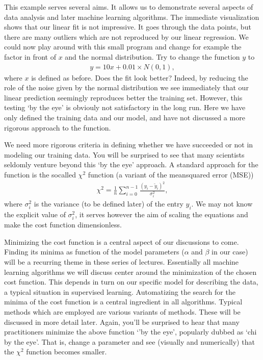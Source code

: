 \documentclass[letterpaper,10pt,english]{sphinxmanual}
\begin{document}
This example serves several aims. It allows us to demonstrate several
aspects of data analysis and later machine learning algorithms. The
immediate visualization shows that our linear fit is not
impressive. It goes through the data points, but there are many
outliers which are not reproduced by our linear regression.  We could
now play around with this small program and change for example the
factor in front of \(x\) and the normal distribution.  Try to change the
function \(y\) to
\begin{equation*}
\begin{split}
y = 10x+0.01 \times N(0,1),
\end{split}
\end{equation*}
where \(x\) is defined as before.  Does the fit look better? Indeed, by
reducing the role of the noise given by the normal distribution we see immediately that
our linear prediction seemingly reproduces better the training
set. However, this testing ‘by the eye’ is obviouly not satisfactory in the
long run. Here we have only defined the training data and our model, and
have not discussed a more rigorous approach to the  function.

We need more rigorous criteria in defining whether we have succeeded or
not in modeling our training data.  You will be surprised to see that
many scientists seldomly venture beyond this ‘by the eye’ approach. A
standard approach for the  function is the so\sphinxhyphen{}called \(\chi^2\)
function (a variant of the mean\sphinxhyphen{}squared error (MSE))
\begin{equation*}
\begin{split}
\chi^2 = \frac{1}{n}
\sum_{i=0}^{n-1}\frac{(y_i-\tilde{y}_i)^2}{\sigma_i^2},
\end{split}
\end{equation*}
where \(\sigma_i^2\) is the variance (to be defined later) of the entry
\(y_i\).  We may not know the explicit value of \(\sigma_i^2\), it serves
however the aim of scaling the equations and make the cost function
dimensionless.

Minimizing the cost function is a central aspect of
our discussions to come. Finding its minima as function of the model
parameters (\(\alpha\) and \(\beta\) in our case) will be a recurring
theme in these series of lectures. Essentially all machine learning
algorithms we will discuss center around the minimization of the
chosen cost function. This depends in turn on our specific
model for describing the data, a typical situation in supervised
learning. Automatizing the search for the minima of the cost function is a
central ingredient in all algorithms. Typical methods which are
employed are various variants of  methods. These will be
discussed in more detail later. Again, you’ll be surprised to hear that
many practitioners minimize the above function ‘’by the eye’, popularly dubbed as
‘chi by the eye’. That is, change a parameter and see (visually and numerically) that
the  \(\chi^2\) function becomes smaller.
\end{document}
